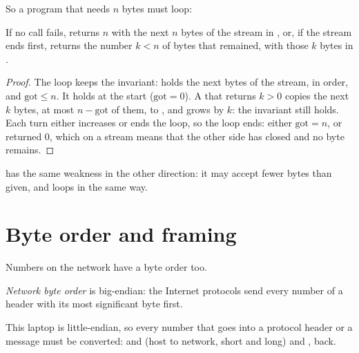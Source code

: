 So a program that needs $n$ bytes must loop:

\label{lst:b2:sockets:recv-all}

\begin{proposition}\label{prop:b2:sockets:recv-all}
If no call fails,  returns $n$ with the next $n$ bytes of the stream in , or,
if the stream ends first, returns the number $k < n$ of bytes that remained, with those $k$ bytes in .
\end{proposition}

\begin{proof}
The loop keeps the invariant: \code{buf[0..got)} holds the next  bytes of the stream, in order, and
$\text{got} \le n$. It holds at the start ($\text{got} = 0$). A  that returns $k > 0$ copies the next $k$
bytes, at most $n - \text{got}$ of them, to , and  grows by $k$: the invariant still holds.
Each turn either increases  or ends the loop, so the loop ends: either $\text{got} = n$, or 
returned 0, which on a stream means that the other side has closed and no byte remains.
\end{proof}

 has the same weakness in the other direction: it may accept fewer bytes than given, and
 loops in the same way.

\section{Byte order and framing}\label{sec:b2:sockets:framing}

Numbers on the network have a byte order too.

\begin{definition}\label{def:b2:sockets:network-order}
\emph{Network byte order} is big-endian: the Internet protocols send every number of a
header with its most significant byte first.
\end{definition}

This laptop is little-endian, so every number that goes into a protocol
header or a message must be converted:  and  (host to network, short and long) and
,  back.

